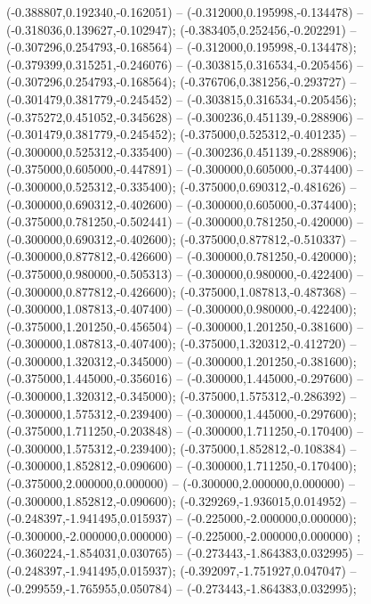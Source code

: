  (-0.388807,0.192340,-0.162051) -- (-0.312000,0.195998,-0.134478) -- (-0.318036,0.139627,-0.102947);
 (-0.383405,0.252456,-0.202291) -- (-0.307296,0.254793,-0.168564) -- (-0.312000,0.195998,-0.134478);
 (-0.379399,0.315251,-0.246076) -- (-0.303815,0.316534,-0.205456) -- (-0.307296,0.254793,-0.168564);
 (-0.376706,0.381256,-0.293727) -- (-0.301479,0.381779,-0.245452) -- (-0.303815,0.316534,-0.205456);
 (-0.375272,0.451052,-0.345628) -- (-0.300236,0.451139,-0.288906) -- (-0.301479,0.381779,-0.245452);
 (-0.375000,0.525312,-0.401235) -- (-0.300000,0.525312,-0.335400) -- (-0.300236,0.451139,-0.288906);
 (-0.375000,0.605000,-0.447891) -- (-0.300000,0.605000,-0.374400) -- (-0.300000,0.525312,-0.335400);
 (-0.375000,0.690312,-0.481626) -- (-0.300000,0.690312,-0.402600) -- (-0.300000,0.605000,-0.374400);
 (-0.375000,0.781250,-0.502441) -- (-0.300000,0.781250,-0.420000) -- (-0.300000,0.690312,-0.402600);
 (-0.375000,0.877812,-0.510337) -- (-0.300000,0.877812,-0.426600) -- (-0.300000,0.781250,-0.420000);
 (-0.375000,0.980000,-0.505313) -- (-0.300000,0.980000,-0.422400) -- (-0.300000,0.877812,-0.426600);
 (-0.375000,1.087813,-0.487368) -- (-0.300000,1.087813,-0.407400) -- (-0.300000,0.980000,-0.422400);
 (-0.375000,1.201250,-0.456504) -- (-0.300000,1.201250,-0.381600) -- (-0.300000,1.087813,-0.407400);
 (-0.375000,1.320312,-0.412720) -- (-0.300000,1.320312,-0.345000) -- (-0.300000,1.201250,-0.381600);
 (-0.375000,1.445000,-0.356016) -- (-0.300000,1.445000,-0.297600) -- (-0.300000,1.320312,-0.345000);
 (-0.375000,1.575312,-0.286392) -- (-0.300000,1.575312,-0.239400) -- (-0.300000,1.445000,-0.297600);
 (-0.375000,1.711250,-0.203848) -- (-0.300000,1.711250,-0.170400) -- (-0.300000,1.575312,-0.239400);
 (-0.375000,1.852812,-0.108384) -- (-0.300000,1.852812,-0.090600) -- (-0.300000,1.711250,-0.170400);
 (-0.375000,2.000000,0.000000) -- (-0.300000,2.000000,0.000000) -- (-0.300000,1.852812,-0.090600);
 (-0.329269,-1.936015,0.014952) -- (-0.248397,-1.941495,0.015937) -- (-0.225000,-2.000000,0.000000);
 (-0.300000,-2.000000,0.000000) -- (-0.225000,-2.000000,0.000000) ;
 (-0.360224,-1.854031,0.030765) -- (-0.273443,-1.864383,0.032995) -- (-0.248397,-1.941495,0.015937);
 (-0.392097,-1.751927,0.047047) -- (-0.299559,-1.765955,0.050784) -- (-0.273443,-1.864383,0.032995);
